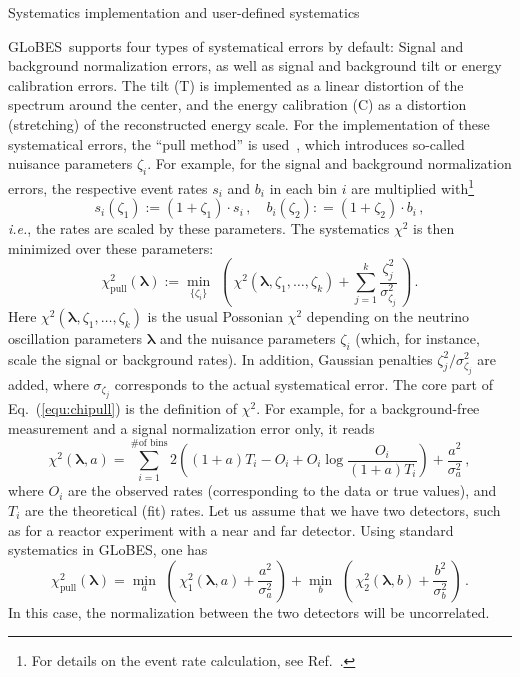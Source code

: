 \documentclass[12pt,a4paper]{article}
\makeatletter
\renewcommand{\section}{\@startsection{section}{1}{0em}{-\baselineskip}%
{\baselineskip}{\normalfont\large\bfseries}}
\newcommand{\ie}{{\it i.e.}}
\newcommand{\eq}{Eq.}
\newcommand{\Ref}{Ref.}
\newcommand{\GLOBES}{{\sf GLoBES}}
\newcommand{\equ}[1]{\eq~(\ref{equ:#1})}
\makeatother
\begin{document}
\section{Systematics implementation and user-defined systematics}

\GLOBES\ supports four types of systematical errors by default: Signal and background
normalization errors, as well as signal and background tilt or energy calibration errors.
The tilt (T) is implemented as a linear distortion of the spectrum around the center,
and the energy calibration (C) as a distortion (stretching) of the reconstructed energy scale.
For the implementation of these systematical errors, the  ``pull method'' is used~\cite{Fogli:2002pt}, which introduces  so-called nuisance parameters $\zeta_i$. 
For example, for the signal and background normalization errors, the respective event rates 
$s_i$ and $b_i$ in
each bin $i$ are multiplied with\footnote{For details on the event rate calculation, see \Ref~\cite{Huber:2004ka}.}
\begin{equation}
s_i(\zeta_1) := (1+\zeta_1)\cdot s_i \, , \quad b_i(\zeta_2) : =(1+\zeta_2)\cdot b_i \, ,
\end{equation} 
\ie, the rates are scaled by these parameters. The systematics $\chi^2$ is then minimized over
these parameters:
\begin{equation}
\chi^2_\mathrm{pull}(\boldsymbol{\lambda}):=\min_{\{\zeta_i\} } \,\, \left( \,
\chi^2(\boldsymbol{\lambda},
\zeta_1, \ldots, \zeta_k)+ \sum_{j=1}^{k} \frac{\zeta_j^2}{\sigma_{\zeta_j}^2}
\, \right)\,.
\label{equ:chipull}
\end{equation}
Here $\chi^2(\boldsymbol{\lambda}, \zeta_1, \ldots, \zeta_k)$ is the usual Possonian $\chi^2$
depending on the neutrino oscillation parameters $\boldsymbol{\lambda}$ and the nuisance
parameters $\zeta_i$ (which, for instance, scale the signal or background rates).
In addition, Gaussian penalties $\zeta_j^2/\sigma_{\zeta_j}^2$ are added, where 
$\sigma_{\zeta_j}$ corresponds to the actual systematical error.
The core part of \equ{chipull} is the definition of $\chi^2$. For example, for a background-free measurement and
a signal normalization error only, it reads
\begin{equation}
  \chi^2 (\boldsymbol{\lambda},a) =  \sum_{i=1}^{\textrm{\# of bins}}2
     \left( (1 + a) T_{i} - O_{i} +
       O_{i} \log \frac{O_{i}}{(1 + a) T_{i}}  \right) + \frac{a^2}{\sigma_a^2} \, ,
\label{equ:chistandard}
\end{equation}
where $O_i$ are the observed rates (corresponding to the data or true values), and $T_i$ are
the theoretical (fit) rates.
%
Let us assume that we have two detectors, such as for a reactor experiment with a near and
far detector. Using standard systematics in \GLOBES , one has
\begin{equation}
\chi^2_\mathrm{pull}(\boldsymbol{\lambda}) = \min_{a } \,\, \left( \,
\chi_1^2(\boldsymbol{\lambda},a)+ \frac{a^2}{\sigma_{a}^2} \, \right)
+\min_{ b } \,\, \left( \,
\chi_2^2(\boldsymbol{\lambda},b)+ \frac{b^2}{\sigma_{b}^2}
\, \right)\,.
\label{equ:chipullex}
\end{equation}
In this case, the normalization between the two detectors will be uncorrelated.
\end{document}
